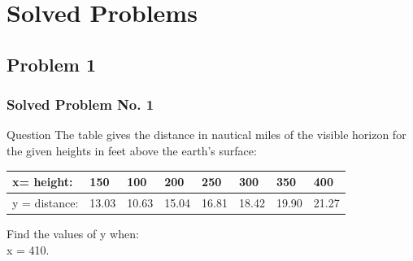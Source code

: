 \documentclass{beamer}
\begin{document}

\section{Solved Problems}
\subsection{Problem 1}
\begin{frame}
\frametitle{Solved Problem No. 1}
\begin{block}{Question}
The table gives the distance in nautical miles of the visible horizon for the given heights in feet above the earth’s surface:
\begin{table}
\centering
\begin{tabular}{|l|l|l|l|l|l|l|l|} 
\hline
x= height:    & 150   & 100   & 200   & 250   & 300   & 350   & 400    \\ 
\hline
y = distance: & 13.03 & 10.63 & 15.04 & 16.81 & 18.42 & 19.90 & 21.27  \\
\hline
\end{tabular}
\end{table}
Find the values of y when:\\
x = 410.
\end{block}
\end{frame}
\end{document}

